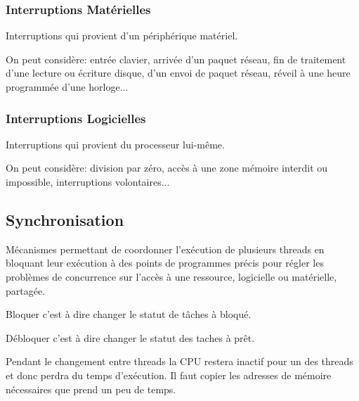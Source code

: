 \documentclass{article}
\begin{document}
\subsubsection{Interruptions Matérielles}
\begin{definition}
    Interruptions qui provient d'un périphérique matériel.

    \begin{example}
        On peut considère: entrée clavier, arrivée d'un paquet réseau, fin de traitement d'une lecture ou écriture disque, d'un envoi de paquet réseau, réveil à une heure programmée d'une horloge...
    \end{example}
\end{definition}

\subsubsection{Interruptions Logicielles}
\begin{definition}
    Interruptions qui provient du processeur lui-même.

    \begin{example}
        On peut considère: division par zéro, accès à une zone mémoire interdit ou impossible, interruptions volontaires...
    \end{example}
\end{definition}



\subsection{Synchronisation}
\begin{definition}\label{def:synchronisation}
    Mécanismes permettant de coordonner l'exécution de plusieurs threads en bloquant leur exécution à des points de programmes précis pour régler les problèmes de concurrence sur l'accès à une ressource, logicielle ou matérielle, partagée.

    \begin{remark}
        Bloquer c'est à dire changer le statut de tâches à bloqué.
    \end{remark}
    \begin{remark}
        Débloquer c'est à dire changer le statut des taches à prêt.
    \end{remark}

    Pendant le changement entre threads la CPU restera inactif pour un des threads et donc perdra du temps d'exécution. Il faut copier les adresses de mémoire nécessaires que prend un peu de temps.
\end{definition}
\end{document}
